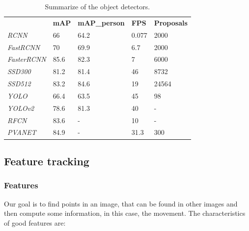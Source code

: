 \begin{table}[H]
\centering

\begin{tabular}{lllll}
                    & \textbf{mAP} & \textbf{mAP\_person} & \textbf{FPS} & \textbf{Proposals} \\
\textit{RCNN}       & 66           & 64.2                 & 0.077        & 2000               \\
\textit{FastRCNN}   & 70           & 69.9                 & 6.7          & 2000               \\
\textit{FasterRCNN} & 85.6         & 82.3                 & 7            & 6000               \\
\textit{SSD300}     & 81.2         & 81.4                 & 46           & 8732               \\
\textit{SSD512}     & 83.2         & 84.6                 & 19           & 24564              \\
\textit{YOLO}       & 66.4         & 63.5                 & 45           & 98                 \\
\textit{YOLOv2}     & 78.6         & 81.3                 & 40           & -                  \\
\textit{RFCN}       & 83.6         & -                    & 10           & -                  \\
\textit{PVANET}     & 84.9         & -                    & 31.3         & 300               
\end{tabular}

\caption{Summarize of the object detectors.}
\label{tableDet}
\end{table}


\subsection{Feature tracking}


\subsubsection{Features}\label{feature}

Our goal is to find points in an image, that can be found in other images and then compute some information, in this case, the movement. The characteristics of good features are:

